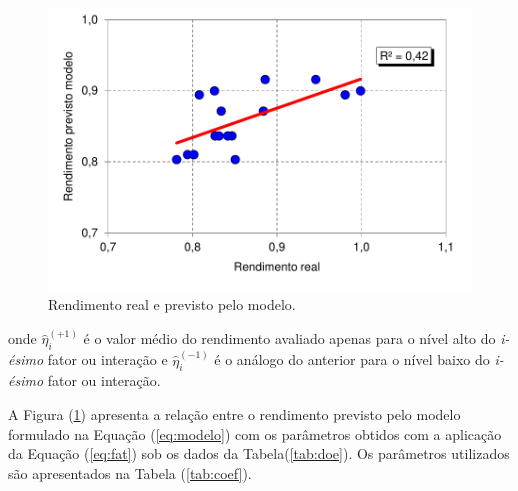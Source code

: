 		\begin{figure}[H]
			\centering
			\includegraphics[scale=0.55, bb=0 0 432 288, trim=0in 0in 0in 0in]{figures/fig06-excel.pdf} %
			\caption{Rendimento real e previsto pelo modelo.}
			\label{fig:reg}
		\end{figure}
		\noindent onde $\hat{\eta}_i^{(+1)}$ é o valor médio do rendimento avaliado apenas para o nível alto do \textit{i-ésimo} fator ou interação e $\hat{\eta}_i^{(-1)}$ é o análogo do anterior para o nível baixo do \textit{i-ésimo} fator ou interação.
		
		A Figura (\ref{fig:reg}) apresenta a relação entre o rendimento previsto pelo modelo formulado na Equação (\ref{eq:modelo}) com os parâmetros obtidos com a aplicação da Equação (\ref{eq:fat}) sob os dados da Tabela(\ref{tab:doe}). Os parâmetros utilizados são apresentados na Tabela (\ref{tab:coef}).
		
